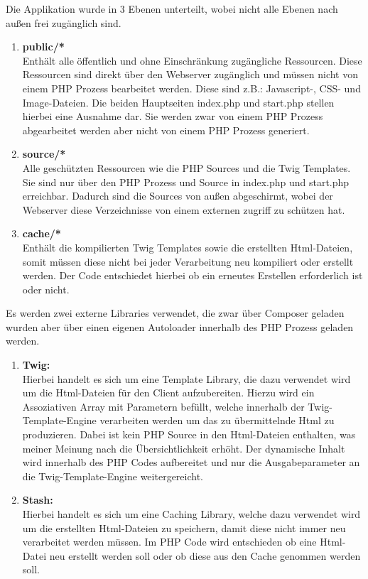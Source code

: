 \documentclass[11pt, a4paper, twoside]{article}   	%
\begin{document}
\newpage 
Die Applikation wurde in 3 Ebenen unterteilt, wobei nicht alle Ebenen nach außen frei zugänglich sind.\\
\begin{enumerate}
	\item \textbf{public/*} \\
	Enthält alle öffentlich und ohne Einschränkung zugängliche Ressourcen. Diese Ressourcen sind direkt über den Webserver zugänglich und müssen nicht von einem PHP Prozess bearbeitet werden. Diese sind z.B.: Javascript-, CSS- und Image-Dateien. Die beiden Hauptseiten index.php und start.php stellen hierbei eine Ausnahme dar. Sie werden zwar von einem PHP Prozess abgearbeitet werden aber nicht von einem PHP Prozess generiert.  
	\item \textbf{source/*} \\
	Alle geschützten Ressourcen wie die PHP Sources und die Twig Templates. Sie sind nur über den PHP Prozess und Source in index.php und start.php erreichbar. Dadurch sind die Sources von außen abgeschirmt, wobei der Webserver diese Verzeichnisse von einem externen zugriff zu schützen hat.
	\item \textbf{cache/*}\\
	Enthält die kompilierten Twig Templates sowie die erstellten Html-Dateien, somit müssen diese nicht bei jeder Verarbeitung neu kompiliert oder erstellt werden. Der Code entschiedet hierbei ob ein erneutes Erstellen erforderlich ist oder nicht.
\end{enumerate}
Es werden zwei externe Libraries verwendet, die zwar über Composer geladen wurden aber über einen eigenen Autoloader innerhalb des PHP Prozess geladen werden.
\begin{enumerate}
	\item \textbf{Twig:}\\
	Hierbei handelt es sich um eine Template Library, die dazu verwendet wird um die Html-Dateien für den Client aufzubereiten. Hierzu wird ein Assoziativen Array mit Parametern befüllt, welche innerhalb der Twig-Template-Engine verarbeiten werden um das zu übermittelnde Html zu produzieren. Dabei ist kein PHP Source in den Html-Dateien enthalten, was meiner Meinung nach die Übersichtlichkeit erhöht. Der dynamische Inhalt wird innerhalb des PHP Codes aufbereitet und nur die Ausgabeparameter an die Twig-Template-Engine weitergereicht.
	\item \textbf{Stash:}\\
	Hierbei handelt es sich um eine Caching Library, welche dazu verwendet wird um die erstellten Html-Dateien zu speichern, damit diese nicht immer neu verarbeitet werden müssen. Im PHP Code wird entschieden ob eine Html-Datei neu erstellt werden soll oder ob diese aus den Cache genommen werden soll.
\end{enumerate}
\newpage
\end{document}
